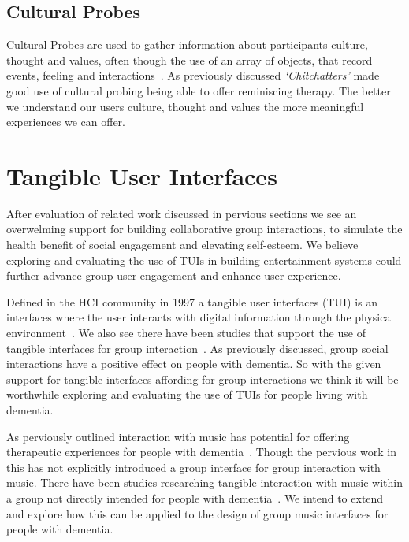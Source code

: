 \subsection{Cultural Probes}\label{probing}
Cultural Probes are used to gather information about participants culture, thought and values, often though the use of an array of objects, that record events, feeling and interactions~\cite{brown2014, gaver1999}. 
As previously discussed \emph{`Chitchatters'} made good use of cultural probing being able to offer reminiscing therapy. 
The better we understand our users culture, thought and values the more meaningful experiences we can offer.

\section{Tangible User Interfaces}
After evaluation of related work discussed in pervious sections we see an overwelming support for building collaborative group interactions, to simulate the health benefit of social engagement and elevating self-esteem. We believe exploring and evaluating the use of TUIs in building entertainment systems could further advance group user engagement and enhance user experience.

Defined in the HCI community in 1997 a tangible user interfaces (TUI) is an interfaces where the user interacts with digital information through the physical environment~\cite{Ishii1997}. We also see there have been studies that support the use of tangible interfaces for group interaction~\cite{Guia2013, Hornecker2006, Lissermann2014, Taylor2008, Taylor2011}. 
As previously discussed, group social interactions have a positive effect on people with dementia. 
So with the given support for tangible interfaces affording for group interactions we think it will be worthwhile exploring and evaluating the use of TUIs for people living with dementia. 

As perviously outlined interaction with music has potential for offering therapeutic experiences for people with dementia~\cite{Boulay2011, symbiosis, Riley2009}. Though the pervious work in this has not explicitly introduced a group interface for group interaction with music. There have been studies researching tangible interaction with music within a group not directly intended for people with dementia~\cite{Taylor2008, Taylor2011}. We intend to extend and explore how this can be applied to the design of group music interfaces for people with dementia.    

